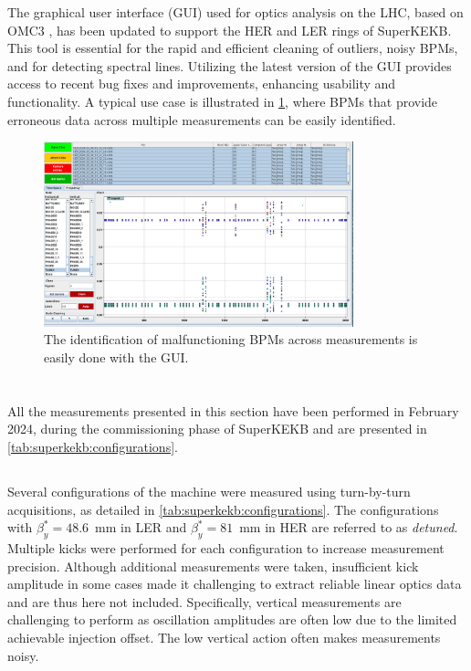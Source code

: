 The graphical user interface (GUI) used for optics analysis on the LHC, based on OMC3
\cite{omc-team_omc3_2021}, has been updated to support the HER and LER rings of SuperKEKB. This tool
is essential for the rapid and efficient cleaning of outliers, noisy BPMs, and for detecting
spectral lines. Utilizing the latest version of the GUI provides access to recent bug fixes and
improvements, enhancing usability and functionality. A typical use case is illustrated in
\cref{fig:kek:gui_bad_bpms}, where BPMs that provide erroneous data across multiple measurements can
be easily identified.

\begin{figure}[!htb]
    \centering
    \includegraphics[width=0.8\textwidth]{./images/kek/GUIbadbpm.png}
    \caption{The identification of malfunctioning BPMs across measurements is easily done with the GUI.}
    \label{fig:kek:gui_bad_bpms}
\end{figure}



\FloatBarrier
\section{}

All the measurements presented in this section have been performed in February 2024, during the
commissioning phase of SuperKEKB and are presented in \cref{tab:superkekb:configurations}.

\subsection{}

Several configurations of the machine were measured using turn-by-turn acquisitions, as detailed in
\cref{tab:superkekb:configurations}. The configurations with $\beta_y^* = 48.6$~mm in LER and
$\beta_y^* = 81$~mm in HER are referred to as \textit{detuned}. Multiple kicks were performed for
each configuration to increase measurement precision. Although additional measurements were taken,
insufficient kick amplitude in some cases made it challenging to extract reliable linear optics data
and are thus here not included. Specifically, vertical measurements are challenging to perform as
oscillation amplitudes are often low due to the limited achievable injection offset. The low 
vertical action often makes measurements noisy.

